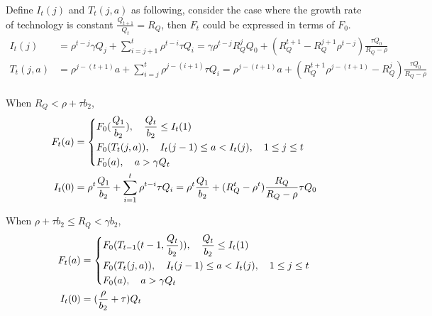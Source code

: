 \documentclass{article}
\newcommand{\1}{\mathbb{1}}
\begin{document}
Define $I_t(j)$ and $T_t(j,a)$ as following, consider the case where the growth rate of technology is constant $\frac{Q_{t+1}}{Q_t} = R_Q$, then $F_t$ could be expressed in terms of $F_0$. 
\begin{align*}
I_t(j) &= \rho^{t-j}\gamma {Q_j}+\sum_{i=j+1}^t\rho^{t-i}\tau Q_i = \gamma \rho^{t-j}R_Q^jQ_0+(R_Q^{t+1}-R_Q^{j+1}\rho^{t-j})\frac{\tau Q_0}{R_Q-\rho} \\
T_t(j,a) &= \rho^{j-(t+1)}a+\sum_{i=j}^t\rho^{j-(i+1)}\tau Q_i  =  \rho^{j-(t+1)}a+(R_Q^{t+1}\rho^{j-(t+1)}-R_Q^{j})\frac{\tau Q_0}{R_Q-\rho} \\
\end{align*}

When $R_Q<\rho+\tau b_2$, 
\begin{align*}
F_t(a)
&= \begin{dcases}
F_0(\frac{Q_1}{b_2}),\quad  \frac{Q_t}{b_2} \leq I_t(1)  \\
F_0(T_t(j,a)), \quad I_t(j-1)\leq a < I_t(j), \quad 1 \leq j \leq t\\
F_0(a), \quad  a>\gamma Q_t \\
\end{dcases} \\
I_t(0) &= \rho^t\frac{Q_1}{b_2}+\sum_{i=1}^t\rho^{t-i}\tau Q_i = \rho^t\frac{Q_1}{b_2}+(R_Q^t-\rho^t)\frac{R_Q}{R_Q-\rho}\tau Q_0
\end{align*}

When $\rho+\tau b_2 \leq R_Q <\gamma b_2$,
\begin{align*}
F_t(a)
&= \begin{dcases}
F_0(T_{t-1}(t-1,\frac{Q_t}{b_2})),\quad  \frac{Q_t}{b_2} \leq I_t(1)  \\
F_0(T_t(j,a)), \quad I_t(j-1)\leq a < I_t(j), \quad 1 \leq j \leq t\\
F_0(a), \quad  a>\gamma Q_t \\
\end{dcases} \\
I_t(0) &= (\frac{\rho}{b_2}+\tau)Q_t
\end{align*}
\end{document}
